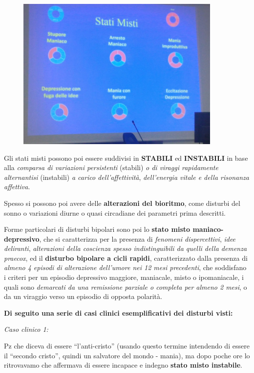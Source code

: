 \begin{itemize}
\begin{figure}[!ht]
\centering
	\includegraphics[width=0.9\textwidth]{02/image11.jpeg}
\end{figure}

Gli stati misti possono poi essere suddivisi in \textbf{STABILI} ed
\textbf{INSTABILI} in base alla \emph{comparsa di variazioni
persistenti} (stabili) \emph{o di viraggi rapidamente alternantisi}
(instabili) \emph{a carico dell'affettività}, \emph{dell'energia vitale
e della risonanza affettiva}.

Spesso si possono poi avere delle \textbf{alterazioni del bioritmo},
come disturbi del sonno o variazioni diurne o quasi circadiane dei
parametri prima descritti.

Forme particolari di disturbi bipolari sono poi lo \textbf{stato misto
maniaco-depressivo}, che si caratterizza per la presenza di
\emph{fenomeni dispercettivi}, \emph{idee deliranti}, \emph{alterazioni
della coscienza spesso indistinguibili da quelli della demenza praecox},
ed il \textbf{disturbo bipolare a cicli rapidi}, caratterizzato dalla
presenza di \emph{almeno 4 episodi di alterazione dell'umore nei 12 mesi
precedenti}, che soddisfano i criteri per un episodio depressivo
maggiore, maniacale, misto o ipomaniacale, i quali sono \emph{demarcati
da una remissione parziale o completa per almeno 2 mesi}, o da un
viraggio verso un episodio di opposta polarità.
\end{itemize}

\textbf{Di seguito una serie di casi clinici esemplificativi dei
disturbi visti:}

\emph{Caso clinico 1:}

Pz che diceva di essere ``l'anti-cristo'' (usando questo termine
intendendo di essere il ``secondo cristo'', quindi un salvatore del
mondo - mania), ma dopo poche ore lo ritrovavamo che affermava di essere
incapace e indegno \textbf{stato misto instabile}.

